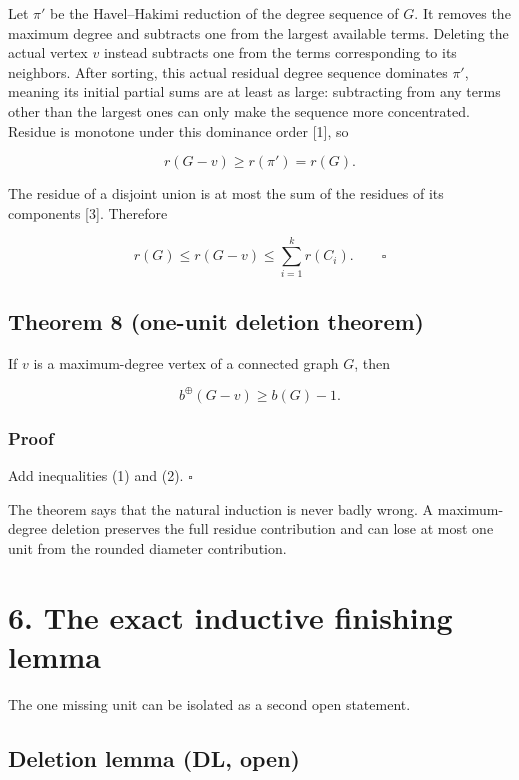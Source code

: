 \documentclass[
  11pt,
  letterpaper,
]{article}
\begin{document}
Let \(\pi'\) be the Havel--Hakimi reduction of the degree sequence of
\(G\). It removes the maximum degree and subtracts one from the largest
available terms. Deleting the actual vertex \(v\) instead subtracts one
from the terms corresponding to its neighbors. After sorting, this
actual residual degree sequence dominates \(\pi'\), meaning its initial
partial sums are at least as large: subtracting from any terms other
than the largest ones can only make the sequence more concentrated.
Residue is monotone under this dominance order {[}1{]}, so

\[
r(G-v)\ge r(\pi')=r(G).
\]

The residue of a disjoint union is at most the sum of the residues of
its components {[}3{]}. Therefore

\[
r(G)
\le r(G-v)
\le \sum_{i=1}^k r(C_i).
\qquad\square
\]

\subsection{Theorem 8 (one-unit deletion
theorem)}\label{theorem-8-one-unit-deletion-theorem}

If \(v\) is a maximum-degree vertex of a connected graph \(G\), then

\[
b^\oplus(G-v)\ge b(G)-1.
\tag{3}
\]

\subsubsection{Proof}\label{proof-7}

Add inequalities (1) and (2). \(\square\)

The theorem says that the natural induction is never badly wrong. A
maximum-degree deletion preserves the full residue contribution and can
lose at most one unit from the rounded diameter contribution.

\section{6. The exact inductive finishing
lemma}\label{the-exact-inductive-finishing-lemma}

The one missing unit can be isolated as a second open statement.

\subsection{Deletion lemma (DL, open)}\label{deletion-lemma-dl-open}
\end{document}
